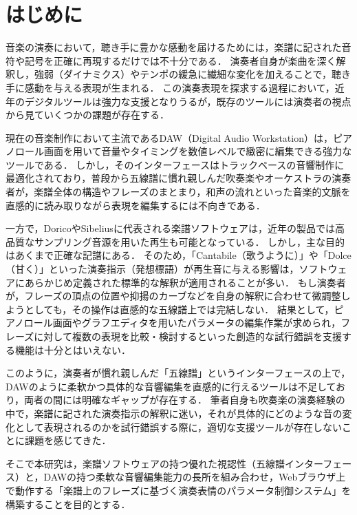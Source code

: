 \section{はじめに}
音楽の演奏において，聴き手に豊かな感動を届けるためには，楽譜に記された音符や記号を正確に再現するだけでは不十分である．
演奏者自身が楽曲を深く解釈し，強弱（ダイナミクス）やテンポの緩急に繊細な変化を加えることで，聴き手に感動を与える表現が生まれる．
この演奏表現を探求する過程において，近年のデジタルツールは強力な支援となりうるが，既存のツールには演奏者の視点から見ていくつかの課題が存在する．

現在の音楽制作において主流であるDAW（Digital Audio Workstation）\cite{DAW}は，ピアノロール画面を用いて音量やタイミングを数値レベルで緻密に編集できる強力なツールである．
しかし，そのインターフェースはトラックベースの音響制作に最適化されており，普段から五線譜に慣れ親しんだ吹奏楽やオーケストラの演奏者が，楽譜全体の構造やフレーズのまとまり，和声の流れといった音楽的文脈を直感的に読み取りながら表現を編集するには不向きである．

一方で，Dorico\cite{Dorico}やSibelius\cite{Sibelius}に代表される楽譜ソフトウェアは，近年の製品では高品質なサンプリング音源を用いた再生も可能となっている．
しかし，主な目的はあくまで正確な記譜にある．
そのため，「Cantabile（歌うように）」や「Dolce（甘く）」といった演奏指示（発想標語）が再生音に与える影響は，ソフトウェアにあらかじめ定義された標準的な解釈が適用されることが多い．
もし演奏者が，フレーズの頂点の位置や抑揚のカーブなどを自身の解釈に合わせて微調整しようとしても，その操作は直感的な五線譜上では完結しない．
結果として，ピアノロール画面やグラフエディタを用いたパラメータの編集作業が求められ，フレーズに対して複数の表現を比較・検討するといった創造的な試行錯誤を支援する機能は十分とはいえない．

このように，演奏者が慣れ親しんだ「五線譜」というインターフェースの上で，DAWのように柔軟かつ具体的な音響編集を直感的に行えるツールは不足しており，両者の間には明確なギャップが存在する．
筆者自身も吹奏楽の演奏経験の中で，楽譜に記された演奏指示の解釈に迷い，それが具体的にどのような音の変化として表現されるのかを試行錯誤する際に，適切な支援ツールが存在しないことに課題を感じてきた．

そこで本研究は，楽譜ソフトウェアの持つ優れた視認性（五線譜インターフェース）と，DAWの持つ柔軟な音響編集能力の長所を組み合わせ，Webブラウザ上で動作する「楽譜上のフレーズに基づく演奏表情のパラメータ制御システム」を構築することを目的とする．

